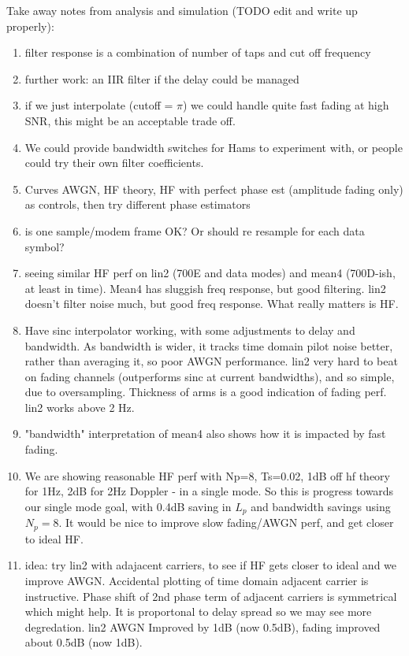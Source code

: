 \documentclass{article}
\begin{document}
Take away notes from analysis and simulation (TODO edit and write up properly):
\begin{enumerate}
\item filter response is a combination of number of taps and cut off frequency
\item further work: an IIR filter if the delay could be managed 
\item if we just interpolate (cutoff = $\pi$) we could handle quite fast fading at high SNR, this might be an acceptable trade off.
\item We could provide bandwidth switches for Hams to experiment with, or people could try their own filter coefficients.
\item Curves AWGN, HF theory, HF with perfect phase est (amplitude fading only) as controls, then try different phase estimators
\item is one sample/modem frame OK?  Or should re resample for each data symbol?
\item seeing similar HF perf on lin2 (700E and data modes) and mean4 (700D-ish, at least in time).  Mean4 has sluggish freq response, but good filtering. lin2 doesn't filter noise much, but good freq response.  What really matters is HF.
\item Have sinc interpolator working, with some adjustments to delay and bandwidth.  As bandwidth is wider, it tracks time domain pilot noise better, rather than averaging it, so poor AWGN performance.  lin2 very hard to beat on fading channels (outperforms sinc at current bandwidths), and so simple, due to oversampling.  Thickness of arms is a good indication of fading perf.   lin2 works above 2 Hz.
\item "bandwidth" interpretation of mean4 also shows how it is impacted by fast fading.
\item We are showing reasonable HF perf with Np=8, Ts=0.02, 1dB off hf theory for 1Hz, 2dB for 2Hz Doppler - in a single mode.  So this is progress towards our single mode goal, with 0.4dB saving in $L_p$ and bandwidth savings using $N_p=8$. It would be nice to improve slow fading/AWGN perf, and get closer to ideal HF.
\item idea: try lin2 with adajacent carriers, to see if HF gets closer to ideal and we improve AWGN.  Accidental plotting of time domain adjacent carrier is instructive.  Phase shift of 2nd phase term of adjacent carriers is symmetrical which might help.  It is proportonal to delay spread so we may see more degredation.  lin2 AWGN Improved by 1dB (now 0.5dB), fading improved about 0.5dB (now 1dB).

\end{enumerate}
\end{document}
